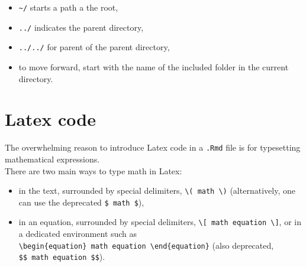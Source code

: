 \documentclass[]{book}
\providecommand{\tightlist}{%
  \setlength{\itemsep}{0pt}\setlength{\parskip}{0pt}}
\theoremstyle{definition}
\theoremstyle{definition}
\theoremstyle{definition}
\theoremstyle{remark}
\begin{document}
\begin{itemize}
\tightlist
\item
  \texttt{\textasciitilde{}/} starts a path a the root,
\item
  \texttt{../} indicates the parent directory,
\item
  \texttt{../../} for parent of the parent directory,
\item
  to move forward, start with the name of the included folder in the
  current directory.
\end{itemize}

\hypertarget{latex-code}{%
\section{Latex code}\label{latex-code}}

The overwhelming reason to introduce Latex code in a \texttt{.Rmd} file
is for typesetting mathematical expressions.\\
There are two main ways to type math in Latex:

\begin{itemize}
\tightlist
\item
  in the text, surrounded by special delimiters,
  \texttt{\textbackslash{}(\ math\ \textbackslash{})} (alternatively,
  one can use the deprecated \texttt{\$\ math\ \$}),
\item
  in an equation, surrounded by special delimiters,
  \texttt{\textbackslash{}{[}\ math\ equation\ \textbackslash{}{]}}, or
  in a dedicated environment such as
  \texttt{\textbackslash{}begin\{equation\}\ math\ equation\ \textbackslash{}end\{equation\}}
  (also deprecated, \texttt{\$\$\ math\ equation\ \$\$}).
\end{itemize}
\end{document}
